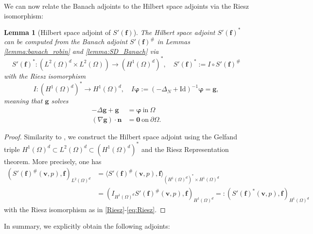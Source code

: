 \documentclass[final,leqno]{scrarticle}
\newtheorem{lemma}[theorem]{Lemma}
\newcommand{\lzo}{L^2(\Omega)}
\newcommand{\Hd}{{H^1(\Omega)^d}}
\newcommand{\lzd}{{L^2(\Omega)^d}}
\begin{document}
We can now relate the Banach adjoints to the Hilbert space adjoints via the Riesz isomorphism:

\begin{lemma}[Hilbert space adjoint of $S{'}(\mathbf{f})$]
  The Hilbert space adjoint $S{'}(\mathbf{f})^*$ can be computed from the Banach adjoint  $S'(\mathbf{f})^{\#}$ in Lemmas \ref{lemma:banach_robin} and \ref{lemma:SD_Banach} via
  \begin{displaymath}
      S'(\mathbf{f})^{*}:(\lzd \times \lzo) \rightarrow (\Hd)^*,\quad S'(\mathbf{f})^{*}
            :=  I \circ S'(\mathbf{f})^{\#} 
  \end{displaymath}  
    with the Riesz isomorphism 
    \begin{equation}\label{Riesz}
      I:(\Hd)^* \rightarrow \Hd, \quad I\boldsymbol{\varphi}:=(-\Delta_N +\text{Id})^{-1}\boldsymbol{\varphi} =\mathbf{g} ,
    \end{equation}
    meaning that $\mathbf{g}$ solves
    \begin{equation} \label{eq:Riesz}
    \begin{split} 
       - \Delta \mathbf{g} + \mathbf{g} &= \boldsymbol{\varphi} \ \text{in} \ \Omega\\
    (\nabla \mathbf{g})\cdot\mathbf{n} &= \mathbf{0} \ \text{on} \ \partial \Omega .
    \end{split}
    \end{equation}
\end{lemma}
\begin{proof}
    Similarity to \cite{sarnighausen2025_2}, we construct the Hilbert space adjoint using the Gelfand triple $\Hd\subset L^2(\Omega)^d\subset (\Hd)^*$ and the Riesz Representation theorem. More precisely, one has
    \begin{align*}
    (S'(\mathbf{f})^{\#} (\mathbf{v},p) ,\mathbf{f} )_\lzd
    &= \langle S'(\mathbf{f})^{\#} (\mathbf{v},p) ,\mathbf{f} \rangle_{(\Hd)^*\times\Hd}\\
    &= (I_\Hd S'(\mathbf{f})^{\#}(\mathbf{v},p),\mathbf{f} )_{\Hd} =: (S'(\mathbf{f})^* (\mathbf{v},p), \mathbf{f})_\Hd 
    \end{align*}
    with the Riesz isomorphism as in \eqref{Riesz}-\eqref{eq:Riesz}.
\end{proof}

In summary, we explicitly obtain the following adjoints:
\end{document}
